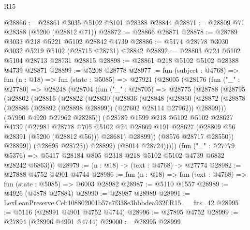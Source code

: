 \begin{lexlean}{R15}
\begin{coremodule}
{{{{{{{{{{{@28866 := @28861 @3035 @5102 @8101 @28388 @28844
@28871 := @28809 @71 @28388 (@5200 (@28812 @71))
@28872 := @28866 @28871
@28878 := @28789 @3033 @218 @5221 @5102 @28842 @4739
@28886 := @5174 @28778 @3030 @3032 @5219 @5102 (@28715 @28731) @28842
@28892 := @28803 @724 @5102 @5104 @28713 @28731 @28815
@28898 := @28861 @218 @5102 @5102 @28388 @4739 @28871
@28899 := @5208 @28778
@28977 := fun (subject : @4768) =>
  fun (n : @18) =>
  fun (state : @5085) =>
  @27921
    (@28005
      (@28176
        (fun ("_" : @27780) =>
        @28248
          (@28704
            (fun ("_" : @28705) =>
            @28775
              (@28788
                (@28795
                  (@28802
                    (@28816
                      (@28822
                        (@28830
                          (@28836
                            (@28848
                              (@28860
                                (@28872
                                  (@28878
                                    (@28886 (@28892 (@28898 @28899)) (@27602 @28114 @27962))
                                    @28899)))
                              (@7990 @4920 @27962 @28285))
                            (@28789
                              @1599
                              @218
                              @5102
                              @5102
                              @28627
                              @4739
                              (@27981
                                @28778
                                @705
                                @5102
                                @24
                                @28669
                                @191
                                @28627
                                (@28809 @56 @28391 (@5200 (@28812 @56)))
                                @28681)
                              @28899))
                          (@8576 @28717 @28550))
                        @28899))
                    (@28695 @28723))
                  @28899)
                (@8014 @28724)))))
        (fun ("_" : @27779 @5376) =>
        @5417 @28184 @805 @2318 @218 @5102 @5102 @4739 @6832 @28242 @6863)))
@28979 := (n : @18) -> (text : @4768) -> @27774
@28982 := @27888 @4752 @4901 @4744
@28986 := fun (n : @18) => fun (text : @4768) => fun (state : @5085) => @6003 @28982
@28987 := @5110 @1557
@28989 := @4926 (@4878 @27884)
@28990 := @28987 @28989
@28991 := LexLeanPreserve.Ceb108802001b57e7f338e3bbbdea932f.R15.__fits_42
@28995 := @5116 (@28991 @4901 @4752 @4744)
@28996 := @27895 @4752
@28999 := @27894 (@28996 @4901 @4744)
@29000 := @28995 @28999
}}}}}}}}}}}
\end{coremodule}
\end{lexlean}
